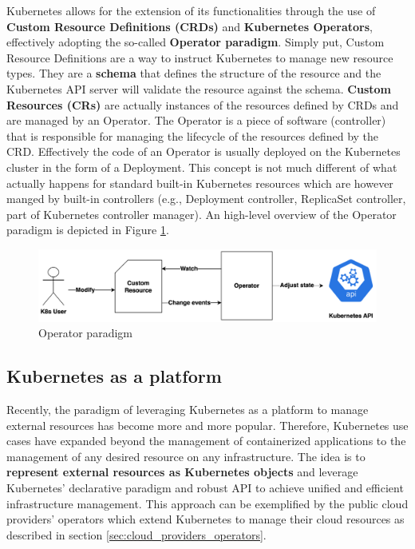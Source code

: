 
Kubernetes allows for the extension of its functionalities through the use of \textbf{Custom Resource Definitions (CRDs)} and \textbf{Kubernetes Operators}, effectively adopting the so-called \textbf{Operator paradigm}.
Simply put, Custom Resource Definitions are a way to instruct Kubernetes to manage new resource types. 
They are a \textbf{schema} that defines the structure of the resource and the Kubernetes API server will validate the resource against the schema.
\textbf{Custom Resources (CRs)} are actually instances of the resources defined by CRDs and are managed by an Operator.
The Operator is a piece of software (controller) that is responsible for managing the lifecycle of the resources defined by the CRD.
Effectively the code of an Operator is usually deployed on the Kubernetes cluster in the form of a Deployment.
This concept is not much different of what actually happens for standard built-in Kubernetes resources which are however manged by built-in controllers (e.g., Deployment controller, ReplicaSet controller, part of Kubernetes controller manager).
An high-level overview of the Operator paradigm is depicted in Figure \ref{fig:operator_paradigm}.

\begin{figure}[H]
    \centering
    \includegraphics[width=1\linewidth]{images/opeartor_paradigm.png}
    \caption{Operator paradigm}
    \label{fig:operator_paradigm}
\end{figure}

\subsection{Kubernetes as a platform}

Recently, the paradigm of leveraging Kubernetes as a platform to manage external resources has become more and more popular.
Therefore, Kubernetes use cases have expanded beyond the management of containerized applications to the management of any desired resource on any infrastructure.
The idea is to \textbf{represent external resources as Kubernetes objects} and leverage Kubernetes' declarative paradigm and robust API to achieve unified and efficient infrastructure management.
This approach can be exemplified by the public cloud providers' operators which extend Kubernetes to manage their cloud resources as described in section \ref{sec:cloud_providers_operators}.

